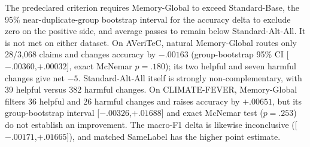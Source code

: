 \documentclass[runningheads]{llncs}
\begin{document}
\begin{table}[t]
\caption{Outcome routing rebuilt around the Standard-Base/Standard-Alt pair.
SameLabel and confidence are matched to the natural Global route count.
Helpful/harmful counts are relative to Standard-Base.}
\label{tab:standard-pair-control}
\centering\small
{}
\end{table}

The predeclared criterion requires Memory-Global to exceed Standard-Base,
the 95\% near-duplicate-group bootstrap interval for the accuracy delta to
exclude zero on the positive side, and average passes to remain below
Standard-Alt-All. It is not met on either dataset. On
AVeriTeC, natural Memory-Global routes only 28/3,068 claims and changes
accuracy by $-.00163$ (group-bootstrap 95\% CI
[$-.00360$,$+.00032$], exact McNemar $p=.180$); its two helpful and seven
harmful changes give net $-5$. Standard-Alt-All itself is strongly
non-complementary, with 39 helpful versus 382 harmful changes. On
CLIMATE-FEVER, Memory-Global filters 36 helpful and 26 harmful changes and
raises accuracy by $+.00651$, but its group-bootstrap interval
[$-.00326$,$+.01688$] and exact McNemar test ($p=.253$) do not establish an
improvement. The macro-F1 delta is likewise inconclusive
([$-.00171$,$+.01665$]), and matched SameLabel has the higher point estimate.
\end{document}
